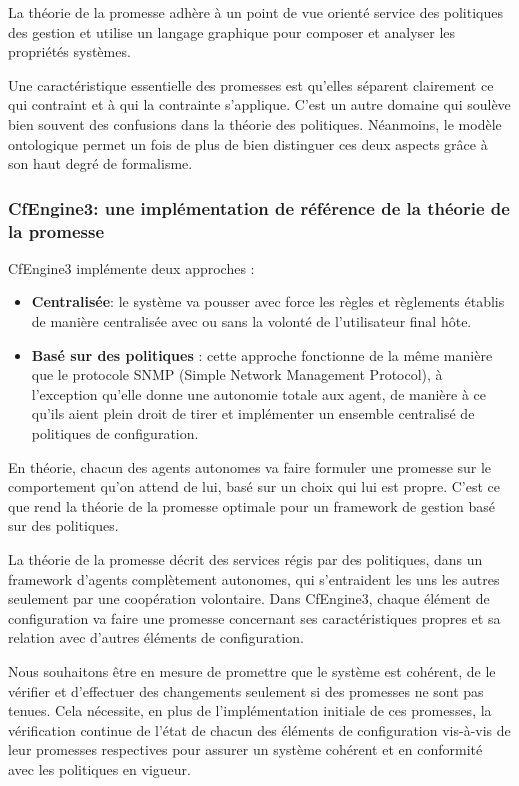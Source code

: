 La théorie de la promesse adhère à un point de vue orienté service des
politiques des gestion et utilise un langage graphique pour composer et analyser
les propriétés systèmes.

Une caractéristique essentielle des promesses est qu'elles séparent clairement
ce qui contraint et à qui la contrainte s'applique. C'est un autre domaine qui
soulève bien souvent des confusions dans la théorie des politiques. Néanmoins,
le modèle ontologique permet un fois de plus de bien distinguer ces deux
aspects grâce à son haut degré de formalisme.

\subsubsection{CfEngine3: une implémentation de référence de la théorie de la
promesse}

CfEngine3 implémente deux approches :

\begin{itemize}
    \item \textbf{Centralisée}: 
        le système va pousser avec force les règles et règlements établis de
        manière centralisée avec ou sans la volonté de l'utilisateur final hôte.
    \item \textbf{Basé sur des politiques} :
        cette approche fonctionne de la même manière que le protocole SNMP
        (Simple Network Management Protocol), à l'exception qu'elle donne une
        autonomie totale aux agent, de manière à ce qu'ils aient plein droit de
        tirer et implémenter un ensemble centralisé de politiques de
        configuration.
\end{itemize}

En théorie, chacun des agents autonomes va faire formuler une promesse sur le
comportement qu'on attend de lui, basé sur un choix qui lui est propre. C'est ce
que rend la théorie de la promesse optimale pour un framework de gestion basé
sur des politiques.

La théorie de la promesse décrit des services régis par des politiques, dans un
framework d'agents complètement autonomes, qui s'entraident les uns les autres
seulement par une coopération volontaire. Dans CfEngine3, chaque élément de
configuration va faire une promesse concernant ses caractéristiques propres et
sa relation avec d'autres éléments de configuration.

Nous souhaitons être en mesure de promettre que le système est cohérent, de le
vérifier et d'effectuer des changements seulement si des promesses ne sont pas
tenues. Cela nécessite, en plus de l'implémentation initiale de ces promesses,
la vérification continue de l'état de chacun des éléments de configuration
vis-à-vis de leur promesses respectives pour assurer un système cohérent et en
conformité avec les politiques en vigueur.

